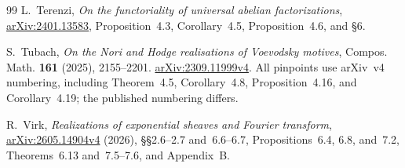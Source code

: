 \documentclass[11pt]{article}
\numberwithin{equation}{section}
\theoremstyle{definition}
\theoremstyle{remark}
\begin{document}
\begin{thebibliography}{99}
L.~Terenzi, \emph{On the functoriality of universal abelian factorizations},
\href{https://arxiv.org/abs/2401.13583}{arXiv:2401.13583},
Proposition~4.3, Corollary~4.5, Proposition~4.6, and \S6.

S.~Tubach, \emph{On the Nori and Hodge realisations of Voevodsky motives},
Compos. Math. \textbf{161} (2025), 2155--2201.
\href{https://arxiv.org/abs/2309.11999v4}{arXiv:2309.11999v4}.
All pinpoints use arXiv~v4 numbering, including Theorem~4.5,
Corollary~4.8, Proposition~4.16, and Corollary~4.19; the published
numbering differs.

R.~Virk, \emph{Realizations of exponential sheaves and Fourier transform},
\href{https://arxiv.org/abs/2605.14904v4}{arXiv:2605.14904v4} (2026),
\S\S2.6--2.7 and~6.6--6.7, Propositions~6.4, 6.8, and~7.2,
Theorems~6.13 and~7.5--7.6, and Appendix~B.

\end{thebibliography}
\end{document}
